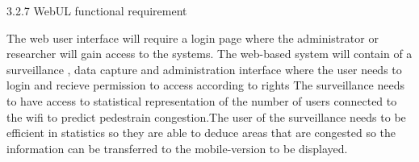 3.2.7 WebUL functional requirement

The web user interface will require a login page where the administrator or researcher will gain access to the systems. The web-based system will contain of a surveillance , data capture and administration interface where the user needs to login and recieve permission to access according to rights
The surveillance needs to have access to statistical representation of the number of users connected to the wifi to predict pedestrain congestion.The user of the surveillance needs to be efficient in statistics so they are able to deduce areas that are congested so the information can be transferred to the mobile-version to be displayed.
